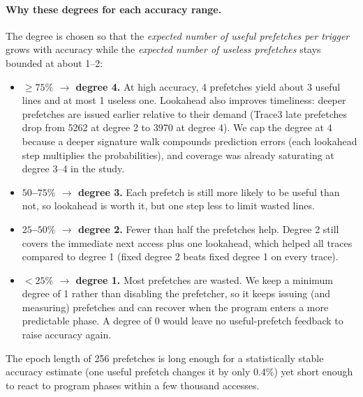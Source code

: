 \documentclass[11pt]{article}
\begin{document}
\paragraph{Why these degrees for each accuracy range.}
The degree is chosen so that the \emph{expected number of useful prefetches per trigger}
grows with accuracy while the \emph{expected number of useless prefetches} stays bounded
at about 1--2:
\begin{itemize}
  \item \textbf{$\geq 75\%$ $\rightarrow$ degree 4.} At high accuracy, 4 prefetches yield about 3
        useful lines and at most 1 useless one. Lookahead also improves timeliness: deeper
        prefetches are issued earlier relative to their demand (Trace3 late prefetches
        drop from 5262 at degree 2 to 3970 at degree 4).
        We cap the degree at 4 because a deeper signature walk compounds prediction errors
        (each lookahead step multiplies the probabilities), and coverage was already
        saturating at degree 3--4 in the study.
  \item \textbf{$50$--$75\%$ $\rightarrow$ degree 3.} Each prefetch is still more likely to be useful
        than not, so lookahead is worth it, but one step less to limit wasted lines.
  \item \textbf{$25$--$50\%$ $\rightarrow$ degree 2.} Fewer than half the prefetches help. Degree 2
        still covers the immediate next access plus one lookahead, which helped all traces
        compared to degree 1 (fixed degree 2 beats fixed degree 1 on every trace).
  \item \textbf{$< 25\%$ $\rightarrow$ degree 1.} Most prefetches are wasted. We keep a minimum
        degree of 1 rather than disabling the prefetcher, so it keeps issuing (and measuring)
        prefetches and can recover when the program enters a more predictable phase.
        A degree of 0 would leave no useful-prefetch feedback to raise accuracy again.
\end{itemize}
The epoch length of 256 prefetches is long enough for a statistically stable accuracy
estimate (one useful prefetch changes it by only 0.4\%) yet short enough to react to
program phases within a few thousand accesses.
\end{document}
